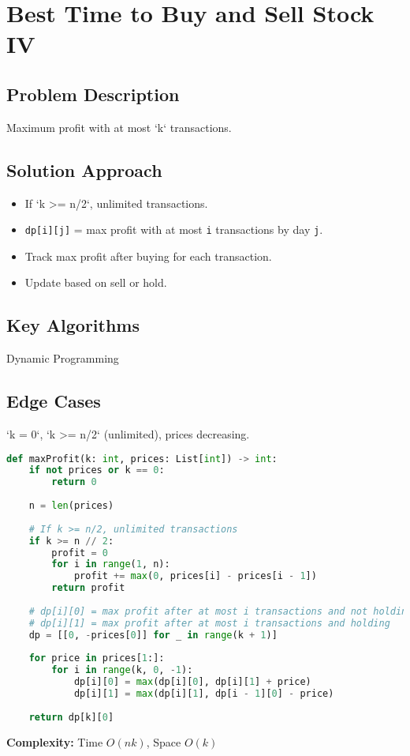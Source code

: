 \documentclass[10pt, a4paper]{article}
\begin{document}
\section{Best Time to Buy and Sell Stock IV}
\subsection*{Problem Description}
Maximum profit with at most `k` transactions.

\subsection*{Solution Approach}
\begin{itemize}
    \item If `k >= n/2`, unlimited transactions.
    \item \texttt{dp[i][j]} = max profit with at most \texttt{i} transactions by day \texttt{j}.
    \item Track max profit after buying for each transaction.
    \item Update based on sell or hold.
\end{itemize}

\subsection*{Key Algorithms}
Dynamic Programming

\subsection*{Edge Cases}
`k = 0`, `k >= n/2` (unlimited), prices decreasing.

\begin{lstlisting}[language=Python]
def maxProfit(k: int, prices: List[int]) -> int:
    if not prices or k == 0:
        return 0
    
    n = len(prices)
    
    # If k >= n/2, unlimited transactions
    if k >= n // 2:
        profit = 0
        for i in range(1, n):
            profit += max(0, prices[i] - prices[i - 1])
        return profit
    
    # dp[i][0] = max profit after at most i transactions and not holding
    # dp[i][1] = max profit after at most i transactions and holding
    dp = [[0, -prices[0]] for _ in range(k + 1)]
    
    for price in prices[1:]:
        for i in range(k, 0, -1):
            dp[i][0] = max(dp[i][0], dp[i][1] + price)
            dp[i][1] = max(dp[i][1], dp[i - 1][0] - price)
    
    return dp[k][0]
\end{lstlisting}
\textbf{Complexity:} Time $O(nk)$, Space $O(k)$
\end{document}
